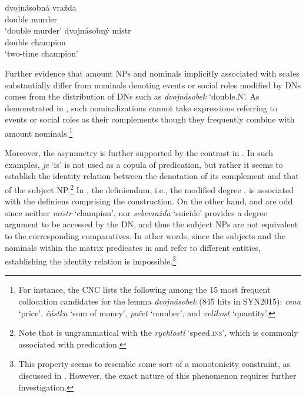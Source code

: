 \documentclass[output=paper,modfonts,hidelinks,newtxmath
\ChapterDOI{10.5281/zenodo.2545513}
]{langscibook}
\begin{document}
\ea \label{dvojnasobny} \ea \gll\label{dvojnasobna-vrazda}dvojnásobná vražda\\
double murder\\
\glt `double murder'
\ex \gll dvojnásobný mistr\label{dvojnasobny-mistr}\\
double champion\\
\glt `two-time champion'
\z \z

\largerpage[2]
\noindent Further evidence that amount NPs and nominals implicitly associated with scales substantially differ from nominals denoting events or social roles modified by  DNs comes from the distribution of  DNs such as \textit{dvojnásobek} `double.N'. As demonstrated in , such nominalizations cannot take expressions referring to events or social roles as their complements though they frequently combine with amount nominals.\footnote{For instance, the CNC lists the following among the 15 most frequent collocation candidates for the lemma \textit{dvojnásobek} (845 hits in SYN2015): \textit{cena} `price', \textit{částka} `sum of money', \textit{počet} `number', and \textit{velikost} `quantity'.}

\ea\label{dvojnásobek} 
\z \z

\noindent Moreover, the asymmetry is further supported by the contrast in . In such examples, \textit{je} `is' is not used as a copula of predication, but rather it seems to establish the identity relation between the denotation of its complement and that of the subject NP.\footnote{Note that  is ungrammatical with the  \textit{rychlostí} `speed.\textsc{ins}', which is commonly associated with predication.} In , the definiendum, i.e., the modified degree , is associated with the definiens comprising the  construction. On the other hand,  and  are odd since neither \textit{mistr} `champion', nor \textit{sebevražda} `suicide' provides a degree argument to be accessed by the DN, and thus the subject NPs are not equivalent to the corresponding comparatives. In other words, since the subjects and the nominals within the matrix predicates in  and  refer to different entities, establishing the identity relation is impossible.\footnote{This property seems to resemble some sort of a monotonicity constraint, as discussed in \cite{schwarzschild2002grammar}. However, the exact nature of this phenomenon requires further investigation.}
\end{document}
